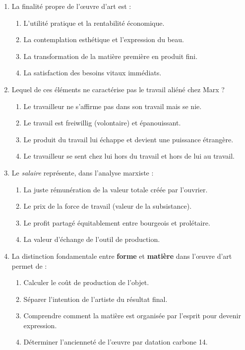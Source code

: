 \documentclass[11pt]{article}
\begin{document}
\begin{exercice}
\begin{enumerate}
    \item La finalité propre de l'œuvre d'art est :
    \begin{enumerate}
        \item L'utilité pratique et la rentabilité économique.
        \item La contemplation esthétique et l'expression du beau.
        \item La transformation de la matière première en produit fini.
        \item La satisfaction des besoins vitaux immédiats.
    \end{enumerate}
    \item Lequel de ces éléments ne caractérise pas le travail aliéné chez Marx ?
    \begin{enumerate}
        \item Le travailleur ne s'affirme pas dans son travail mais se nie.
        \item Le travail est freiwillig (volontaire) et épanouissant.
        \item Le produit du travail lui échappe et devient une puissance étrangère.
        \item Le travailleur se sent chez lui hors du travail et hors de lui au travail.
    \end{enumerate}
    \item Le \textit{salaire} représente, dans l'analyse marxiste :
    \begin{enumerate}
        \item La juste rémunération de la valeur totale créée par l'ouvrier.
        \item Le prix de la force de travail (valeur de la subsistance).
        \item Le profit partagé équitablement entre bourgeois et prolétaire.
        \item La valeur d'échange de l'outil de production.
    \end{enumerate}
    \item La distinction fondamentale entre \textbf{forme} et \textbf{matière} dans l'œuvre d'art permet de :
    \begin{enumerate}
        \item Calculer le coût de production de l'objet.
        \item Séparer l'intention de l'artiste du résultat final.
        \item Comprendre comment la matière est organisée par l'esprit pour devenir expression.
        \item Déterminer l'ancienneté de l'œuvre par datation carbone 14.
    \end{enumerate}
\end{enumerate}
\end{exercice}
\end{document}
